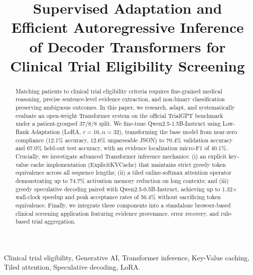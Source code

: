 \documentclass[conference]{IEEEtran}
\begin{document}
\title{Supervised Adaptation and Efficient Autoregressive Inference of Decoder Transformers for Clinical Trial Eligibility Screening}

\author{
}

\maketitle

\begin{abstract}
Matching patients to clinical trial eligibility criteria requires fine-grained medical reasoning, precise sentence-level evidence extraction, and non-binary classification preserving ambiguous outcomes. In this paper, we research, adapt, and systematically evaluate an open-weight Transformer system on the official TrialGPT benchmark under a patient-grouped 37/8/8 split. We fine-tune Qwen2.5-1.5B-Instruct using Low-Rank Adaptation (LoRA, $r=16, \alpha=32$), transforming the base model from near-zero compliance (12.1\% accuracy, 12.6\% unparseable JSON) to 70.4\% validation accuracy and 67.0\% held-out test accuracy, with an evidence localization micro-F1 of 40.1\%. Crucially, we investigate advanced Transformer inference mechanics: (i) an explicit key-value cache implementation (ExplicitKVCache) that maintains strict greedy token equivalence across all sequence lengths; (ii) a tiled online-softmax attention operator demonstrating up to 74.7\% activation memory reduction on long contexts; and (iii) greedy speculative decoding paired with Qwen2.5-0.5B-Instruct, achieving up to 1.32$\times$ wall-clock speedup and peak acceptance rates of 56.4\% without sacrificing token equivalence. Finally, we integrate these components into a standalone browser-based clinical screening application featuring evidence provenance, error recovery, and rule-based trial aggregation.
\end{abstract}

\begin{IEEEkeywords}
Clinical trial eligibility, Generative AI, Transformer inference, Key-Value caching, Tiled attention, Speculative decoding, LoRA.
\end{IEEEkeywords}
\end{document}
